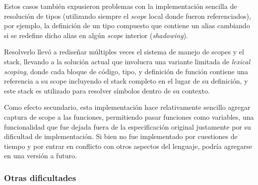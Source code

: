 Estos casos también expusieron problemas con la implementación sencilla de resolución de tipos (utilizando siempre el \textit{scope} local donde fueron referenciados), por ejemplo, la definición de un tipo compuesto que contiene un alias cambiando si se redefine dicho alias en algún \textit{scope} interior (\textit{shadowing}).

Resolverlo llevó a rediseñar múltiples veces el sistema de manejo de scopes y el stack, llevando a la solución actual que involucra una variante limitada de \textit{lexical scoping}, donde cada bloque de código, tipo, y definición de función contiene una referencia a su scope incluyendo el stack completo en el lugar de su definición, y este stack es utilizado para resolver símbolos dentro de su contexto.

Como efecto secundario, esta implementación hace relativamente sencillo agregar captura de scope a las funciones, permitiendo pasar funciones como variables, una funcionalidad que fue dejada fuera de la especificación original justamente por su dificultad de implementación. Si bien no fue implementado por cuestiones de tiempo y por entrar en conflicto con otros aspectos del lenguaje, podría agregarse en una versión a futuro.

\subsubsection{Otras dificultades}

